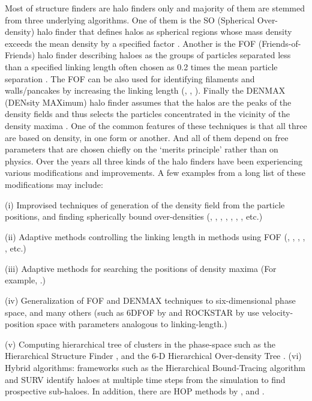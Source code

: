 Most of structure finders are halo finders only and majority of them are stemmed from three underlying algorithms. One of them is the SO (Spherical Over-density) halo finder that defines halos  as spherical regions whose mass density exceeds the mean density by a specified factor \citep{Press1974}. 
Another is the FOF  (Friends-of-Friends) halo finder describing haloes  as the groups of particles separated less than a specified linking length often chosen as 0.2 times the mean particle separation \citep{Davis1985}. 
The FOF can be also used for identifying filaments and walls/pancakes by increasing the linking length (\citealt{Zeldovich1982}, \citealt{Shandarin1983a}, \citealt{Shandarin2010b}). Finally the DENMAX (DENsity MAXimum) halo finder assumes that the halos are the peaks of the density  fields and thus selects the particles concentrated in the vicinity of the density maxima \citep{Bertschinger1991}. One of the common features of these  techniques is that all three are based on density, in one form or another. And all of them depend on free parameters that are chosen chiefly on the `merits principle' \citep{Forero-Romero2009a} rather than on physics. Over the years all three kinds of the halo finders have been experiencing various modifications and improvements.  A few examples from a long list of these modifications may include: 


(i) Improvised techniques of generation of the density field from the particle positions, and finding spherically bound over-densities (\citealt{Lacey1994}, \citealt{Jenkins2001}, \citealt{Evrard2002}, \citealt{Weinberg1997}, \citealt{Neyrinck2005}, \citealt{Knollmann2009a}, \citealt{Sutter2010a}, \citealt{Planelles2010} etc.) 

(ii) Adaptive methods controlling the linking length in methods using FOF (\citealt{Davis1985}, \citealt{vanKampen1995}, \citealt{Gottlober1999}, \citealt{Springel2001a}, \citealt{Habib2009a}, \citealt{Rasera2010} etc.)

(iii) Adaptive methods for searching the positions of density maxima (For example, \citealt{Klypin1999}.)

(iv) Generalization of FOF and DENMAX techniques to six-dimensional phase space, and many others (such as 6DFOF by \citealt{Diemand2006} and ROCKSTAR by \citealt{Behroozi2013a} use velocity-position space with parameters analogous to linking-length.)

(v) Computing hierarchical tree of clusters in the phase-space such as the Hierarchical Structure Finder \cite{Maciejewski2009c}, and the 6-D Hierarchical Over-density Tree \cite{Ascasibar2010}. 
(vi) Hybrid algorithms: frameworks such as the Hierarchical Bound-Tracing algorithm \cite{Han2012} and SURV \cite{Giocoli2010a} identify haloes at multiple time steps from the simulation to find prospective sub-haloes. In addition, there are HOP methods by \cite{Eisenstein1998}, \cite{Tweed2009} and \cite{Skory2010}. 


